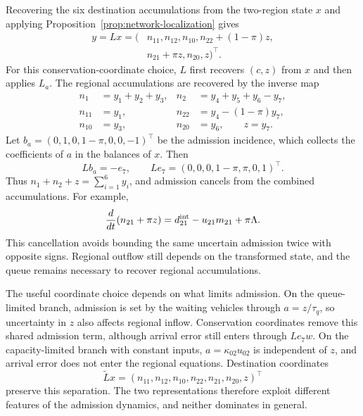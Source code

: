 \documentclass[final]{cas-sc}
\theoremstyle{definition}
\theoremstyle{plain}
\theoremstyle{definition}
\theoremstyle{plain}
\begin{document}
Recovering the six destination accumulations from the two-region state
$x$ and applying Proposition~\ref{prop:network-localization} gives
\begin{equation}
\begin{aligned}
y=Lx=(&n_{11},n_{12},n_{10},n_{22}+(1-\pi)z,\\
&n_{21}+\pi z,n_{20},z)^\top .
\end{aligned}
\label{eq:new-conservation-coordinates}
\end{equation}
For this conservation-coordinate choice, $L$ first recovers $(c,z)$
from $x$ and then applies $L_a$. The regional accumulations are
recovered by the inverse map
\begin{equation}
\begin{aligned}
n_1&=y_1+y_2+y_3, & n_2&=y_4+y_5+y_6-y_7,\\
n_{11}&=y_1, & n_{22}&=y_4-(1-\pi)y_7,\\
n_{10}&=y_3, & n_{20}&=y_6,\qquad z=y_7.
\end{aligned}
\label{eq:new-inverse-coordinates}
\end{equation}
Let $b_a=(0,1,0,1-\pi,0,0,-1)^\top$ be the admission incidence, which
collects the coefficients of $a$ in the balances of $x$. Then
\begin{equation}
Lb_a=-e_7,\qquad Le_7=(0,0,0,1-\pi,\pi,0,1)^\top .
\label{eq:new-conservation-incidence}
\end{equation}
Thus $n_1+n_2+z=\sum_{i=1}^{6}y_i$, and admission cancels from the
combined accumulations. For example,
\[
\frac{d}{dt}(n_{21}+\pi z)=d_{21}^{\rm int}-u_{21}m_{21}+\pi\Lambda .
\]
This cancellation avoids bounding the same uncertain admission twice
with opposite signs. Regional outflow still depends on the transformed
state, and the queue remains necessary to recover regional
accumulations.

The useful coordinate choice depends on what limits admission. On the
queue-limited branch, admission is set by the waiting vehicles through
$a=z/\tau_q$, so uncertainty in $z$ also affects regional inflow.
Conservation coordinates remove this shared admission term, although
arrival error still enters through $Le_7w$. On the capacity-limited
branch with constant inputs, $a=\kappa_{02}u_{02}$ is independent of
$z$, and arrival error does not enter the regional equations.
Destination coordinates
\[
\widetilde Lx=(n_{11},n_{12},n_{10},n_{22},n_{21},n_{20},z)^\top
\]
preserve this separation. The two representations therefore exploit
different features of the admission dynamics, and neither dominates in
general.
\end{document}
